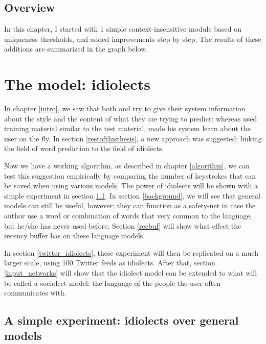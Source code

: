 \documentclass[12pt]{article}
\let\stdsection\section
\renewcommand\section{\newpage\stdsection}
\begin{document}
\subsection{Overview}
In this chapter, I started with 1 simple context-insensitive module based on uniqueness thresholds, and added improvements step by step. The results of these additions are summarized in the graph below.








\section{The model: idiolects} \label{model}

In chapter \ref{intro}, we saw that both  and  try to give their system information about the style and the content of what they are trying to predict: whereas  used training material similar to the test material,  made his system learn about the user on the fly. In section \ref{restofthisthesis}, a new approach was suggested: linking the field of word prediction to the field of idiolects.


Now we have a working algorithm, as described in chapter \ref{algorithm}, we can test this suggestion empirically by comparing the number of keystrokes that can be saved when using various models. The power of idiolects will be shown with a simple experiment in section \ref{simple_exp}. In section \ref{background}, we will see that general models can still be useful, however; they can function as a safety-net in case the author use a word or combination of words that very common to the language, but he/she has never used before. Section \ref{recbuf} will show what effect the recency buffer has on these language models.

In section \ref{twitter_idiolects}, these experiment will then be replicated on a much larger scale, using 100 Twitter feeds as idiolects. After that, section \ref{input_networks} will show that the idiolect model can be extended to what will be called a sociolect model: the language of the people the user often communicates with.

\subsection{A simple experiment: idiolects over general models} \label{simple_exp}
\end{document}
